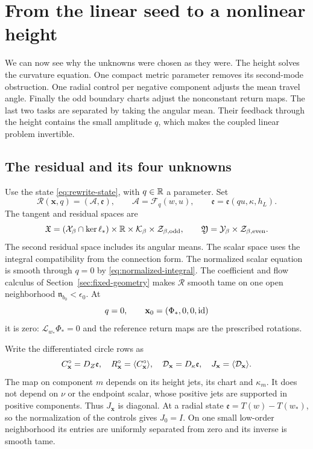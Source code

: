 \section{From the linear seed to a nonlinear height}
\label{sec:solving-the-equation}
\label{sec:exact-return-height}

We can now see why the unknowns were chosen as they were. The height
solves the curvature equation. One compact metric parameter removes
its second-mode obstruction. One radial control per negative component
adjusts the mean travel angle. Finally the odd boundary charts adjust
the nonconstant return maps. The last two tasks are separated by taking
the angular mean. Their feedback through the height contains the small
amplitude $q$, which makes the coupled linear problem invertible.

\subsection{The residual and its four unknowns}

Use the state \eqref{eq:rewrite-state}, with $q\in\mathbb R$ a parameter.
Set
\begin{equation}\label{eq:readable-joint-residual}
 \mathcal R(\mathbf x,q)=(\mathcal A,\mathfrak e),
 \qquad \mathcal A=\mathcal F_q(w,u),
 \qquad \mathfrak e=\mathfrak e(qu,\kappa,h_L).
\end{equation}
The tangent and residual spaces are
\[
 \mathfrak X=(\mathcal X_\beta\cap\ker\ell_*)\times\mathbb R
       \times\mathcal K_\beta\times\mathcal Z_{\beta,\mathrm{odd}},
 \qquad
 \mathfrak Y=\mathcal Y_\beta\times\mathcal Z_{\beta,\mathrm{even}}.
\]
The second residual space includes its angular means. The scalar
space uses the integral compatibility from the connection form.
The normalized scalar equation is smooth through $q=0$ by
\eqref{eq:normalized-integral}. The coefficient and flow calculus of
Section~\ref{sec:fixed-geometry} makes $\mathcal R$ smooth tame on
one open neighborhood $\mathfrak n_{b_0}<\epsilon_0$.
At
\[
 q=0,\qquad \mathbf x_0=(\Phi_*,0,0,\mathrm{id})
\]
it is zero: $\mathscr L_{w_*}\Phi_*=0$ and the reference return maps
are the prescribed rotations.

Write the differentiated circle rows as
\begin{equation}\label{eq:joint-circle-linear-rows}
 C_{\mathbf x}^{\circ}=D_Z\mathfrak e,\quad
 R_{\mathbf x}^{\circ}=\langle C_{\mathbf x}^{\circ}\rangle,\quad
 \mathcal D_{\mathbf x}=D_\kappa\mathfrak e,\quad
 J_{\mathbf x}=\langle \mathcal D_{\mathbf x}\rangle.
\end{equation}
The map on component $m$ depends on its height jets, its chart and
$\kappa_m$. It does not depend on $\nu$ or the endpoint scalar,
whose positive jets are supported in positive components.
Thus $J_{\mathbf x}$ is diagonal. At a radial state
$\mathfrak e=T(w)-T(w_*)$, so the normalization of the controls gives
$J_0=I$. On one small low-order neighborhood its entries are uniformly
separated from zero and its inverse is smooth tame.

